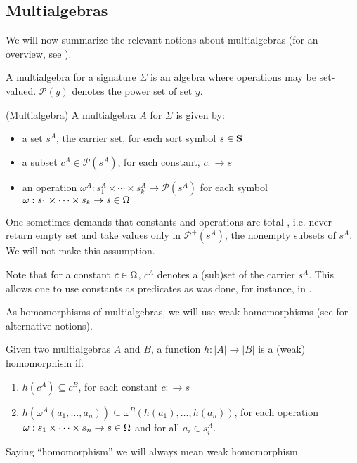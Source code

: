\subsection{Multialgebras}
We will now summarize the relevant notions about multialgebras (for an
overview, see \cite{multi,catrel}).

A multialgebra for a signature $\Sigma$ is an algebra where operations may be
set-valued. ${\mathcal{P}}(y)$ denotes the power set of set $y$.

\begin{definition}\label{def:ma}
(Multialgebra) A multialgebra $A$ for $\Sigma$ is given by:
\begin{itemize}
\item  a set $s^A$, the carrier set, for each sort symbol $s\in{\bf S}$
\item  a subset $ c^A \in {\mathcal{P}}(s^A)$, for each constant, $c:\to s$
\item an operation $\omega^A : s_1^A \times \cdots \times s_k^A \to {\mathcal{P}}(s^A)$
	for each symbol $\omega : s_1\times\cdots\times s_k \to s \in \Omega$
\end{itemize}
\end{definition}
One sometimes demands that constants and operations are total
\cite{multi,toplas}, i.e. never return empty set and take values only in
${\mathcal{P}}^+ (s^A)$, the nonempty subsets of $s^A$. We will not make this
assumption.%

Note that for a constant $c \in \Omega$, $c^A$ denotes a (sub)set of the
carrier $s^A$. This allows one to use constants as predicates as was done,
for instance, in \cite{partial}. 

As homomorphisms of multialgebras, we will use weak homomorphisms (see
\cite{catrel} for alternative notions).
\begin{definition}Given two multialgebras $A$ and $B$, 
a function $h: |A| \to |B|$ is a (weak) homomorphism if:
\begin{enumerate}
\item $h(c^A) \subseteq c^B$, for each constant $c: \to s$ 
\item $h(\omega^A(a_1 , \ldots , a_n)) \subseteq\omega^B(h(a_1), \ldots ,h(a_n))$,
for each operation  $\omega:s_1\times\cdots\times s_n\to s\in\Omega$ and for all $a_i \in s_{i}^A$.
\end{enumerate}
\end{definition}
Saying ``homomorphism'' we will always mean weak homomorphism.

